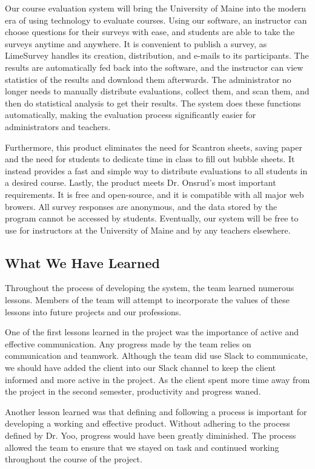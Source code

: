 \documentclass{article}
\begin{document}
Our course evaluation system will bring the University of Maine into the modern era of using technology to evaluate courses. Using our software, an instructor can choose questions for their surveys with ease, and students are able to take the surveys anytime and anywhere. It is convenient to publish a survey, as LimeSurvey handles its creation, distribution, and e-mails to its participants. The results are automatically fed back into the software, and the instructor can view statistics of the results and download them afterwards. The administrator no longer needs to manually distribute evaluations, collect them, and scan them, and then do statistical analysis to get their results. The system does these functions automatically, making the evaluation process significantly easier for administrators and teachers.

Furthermore, this product eliminates the need for Scantron sheets, saving paper and the need for students to dedicate time in class to fill out bubble sheets. It instead provides a fast and simple way to distribute evaluations to all students in a desired course. Lastly, the product meets Dr. Onsrud's most important requirements. It is free and open-source, and it is compatible with all major web browers. All survey responses are anonymous, and the data stored by the program cannot be accessed by students. Eventually, our system will be free to use for instructors at the University of Maine and by any teachers elsewhere.

\subsection{What We Have Learned}

Throughout the process of developing the system, the team learned numerous lessons. Members of the team will attempt to incorporate the values of these lessons into future projects and our professions. 

One of the first lessons learned in the project was the importance of active and effective communication. Any progress made by the team relies on communication and teamwork. Although the team did use Slack to communicate, we should have added the client into our Slack channel to keep the client informed and more active in the project. As the client spent more time away from the project in the second semester, productivity and progress waned.

Another lesson learned was that defining and following a process is important for developing a working and effective product. Without adhering to the process defined by Dr. Yoo, progress would have been greatly diminished. The process allowed the team to ensure that we stayed on task and continued working throughout the course of the project. 
\end{document}
